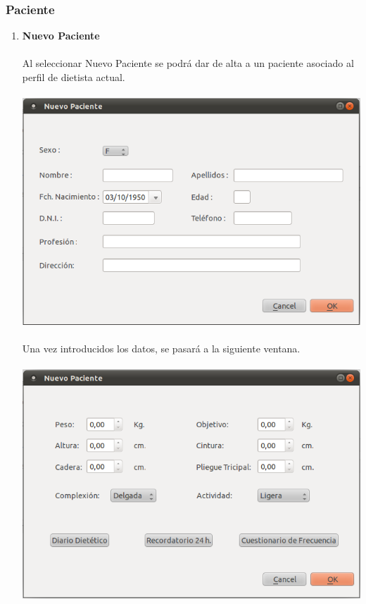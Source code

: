 \documentclass[12pt, spanish]{article}
\begin{document}
\subsubsection{Paciente}
\begin{enumerate}
\item \textbf{Nuevo Paciente}\\\\
Al seleccionar Nuevo Paciente se podrá dar de alta a un paciente asociado al perfil de dietista actual.\\\\
\includegraphics[scale=0.5]{Image/paciente-nuevo1.png}\\\\
Una vez introducidos los datos, se pasará a la siguiente ventana.\\\\
\includegraphics[scale=0.5]{Image/paciente-nuevo2.png}\\\\

\end{enumerate}
\end{document}

